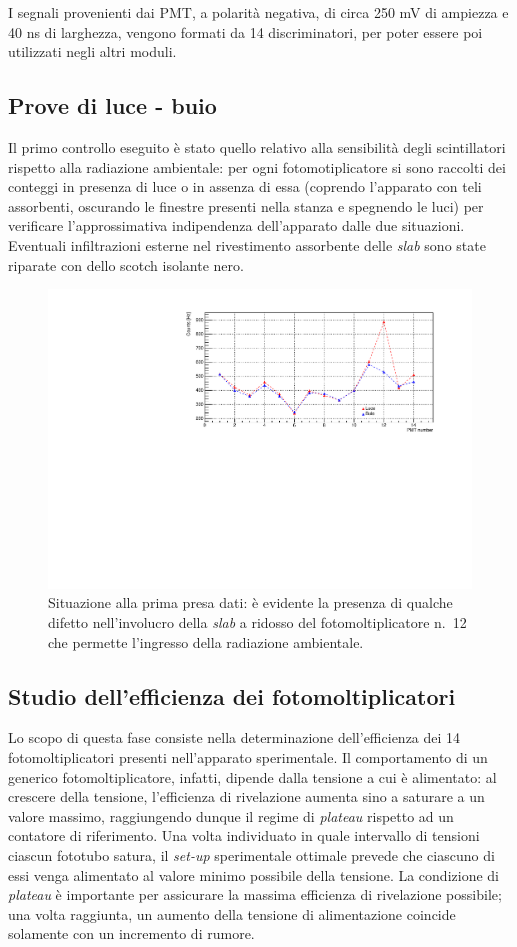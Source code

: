 \documentclass[10pt, oneside, a4paper]{article}   	%
\begin{document}
I segnali provenienti dai PMT, a polarità negativa, di circa 250 mV di ampiezza e 40 ns di larghezza, vengono formati da 14 discriminatori, per poter essere poi utilizzati negli altri moduli.
%
%
\subsection{Prove di luce - buio}
Il primo controllo eseguito è stato quello relativo alla sensibilità degli scintillatori rispetto alla radiazione ambientale: per ogni fotomotiplicatore si sono raccolti dei conteggi in presenza di luce o in assenza di essa (coprendo l'apparato con teli assorbenti, oscurando le finestre presenti nella stanza e spegnendo le luci) per verificare l'approssimativa indipendenza dell'apparato dalle due situazioni. Eventuali infiltrazioni esterne nel rivestimento assorbente delle \emph{slab} sono state riparate con dello scotch isolante nero. 
%
\begin{figure}[h]
	\centering
	\includegraphics[scale=0.6]{img/luce_buio_100s.pdf}
	\caption{Situazione alla prima presa dati: è evidente la presenza di qualche difetto  nell'involucro della \emph{slab} a ridosso del fotomoltiplicatore n.~12 che permette l'ingresso della radiazione ambientale.}
\end{figure}
%
\subsection{Studio dell'efficienza dei fotomoltiplicatori}
Lo scopo di questa fase consiste nella determinazione dell'efficienza dei 14 fotomoltiplicatori presenti nell'apparato sperimentale. Il comportamento di un generico fotomoltiplicatore, infatti, dipende dalla tensione a cui è alimentato: al crescere della tensione, l'efficienza di rivelazione aumenta sino a saturare a un valore massimo, raggiungendo dunque il regime di \textit{plateau} rispetto ad un contatore di riferimento.
Una volta individuato in quale intervallo di tensioni ciascun fototubo satura, il \emph{set-up} sperimentale ottimale prevede che ciascuno di essi venga alimentato al valore minimo possibile della tensione. 
La condizione di \textit{plateau} è importante per assicurare la massima efficienza di rivelazione possibile; una volta raggiunta, un aumento della tensione di alimentazione coincide solamente con un incremento di rumore.  
\end{document}
